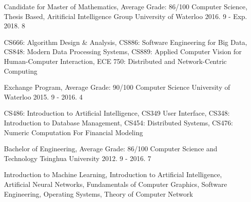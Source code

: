 \begin{cventries} 
  \cventry
    {Candidate for Master of Mathematics, Average Grade: 86/100}
    {Computer Science, Thesis Based, Aritificial Intelligence Group}
    {University of Waterloo}
    {2016. 9 - Exp. 2018. 8}
    {
      \begin{cvitems}
          \item{CS666: Algorithm Design \& Analysis, CS886: Software Engineering for Big Data, CS848: Modern Data Processing Systems, CS889: Applied Computer Vision for Human-Computer Interaction, ECE 750: Distributed and Network-Centric Computing}
      \end{cvitems}
    }
  \cventry
    {Exchange Program, Average Grade: 90/100}
    {Computer Science}
    {University of Waterloo}
    {2015. 9 - 2016. 4}
    {
      \begin{cvitems}
          \item {CS486: Introduction to Artificial Intelligence, CS349 User Interface, CS348: Introduction to Database Management, CS454: Distributed Systems, CS476: Numeric Computation For Financial Modeling}
      \end{cvitems}
    }
  \cventry
    {Bachelor of Engineering, Average Grade: 86/100}
    {Computer Science and Technology}
    {Tsinghua University}
    {2012. 9 - 2016. 7}
    {
      \begin{cvitems}
          \item {Introduction to Machine Learning, Introduction to Artificial Intelligence, Artificial Neural Networks, Fundamentals of Computer Graphics, Software Engineering, Operating Systems, Theory of Computer Network}
      \end{cvitems}
    }
\end{cventries}
